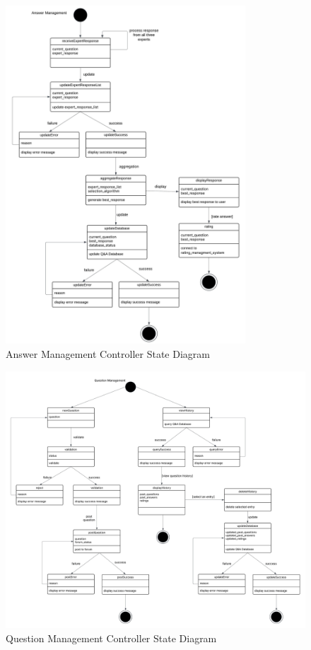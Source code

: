 \documentclass[]{article}
\numberwithin{figure}{section}
\begin{document}
\begin{figure}[h]
    \centering
    \includegraphics[width=0.8\textwidth]{diagrams/state/AnswerStateDiagram.jpeg} %
    \caption{Answer Management Controller State Diagram}
\end{figure}

\begin{figure}[h]
    \centering
    \includegraphics[width=1\textwidth]{diagrams/state/QuestionStateDiagram.jpeg} %
    \caption{Question Management Controller State Diagram}
\end{figure}
\end{document}
